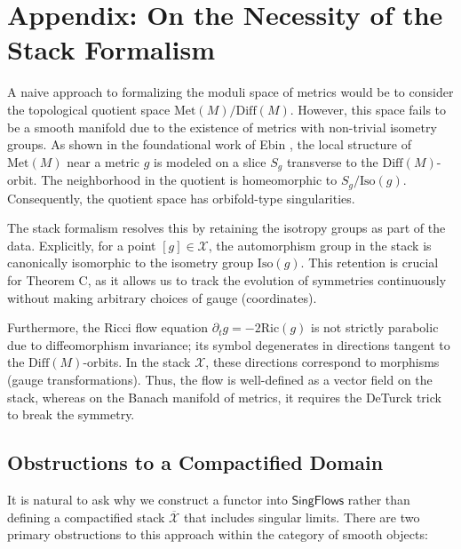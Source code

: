 \documentclass[11pt]{article}
\newcommand{\SingFlows}{\mathsf{SingFlows}}
\newcommand{\Met}{\mathrm{Met}}
\newcommand{\Diff}{\mathrm{Diff}}
\begin{document}
\appendix

\newpage
\section*{Appendix: On the Necessity of the Stack Formalism}


A naive approach to formalizing the moduli space of metrics would be to consider the topological quotient space $\Met(M) / \Diff(M)$. However, this space fails to be a smooth manifold due to the existence of metrics with non-trivial isometry groups. As shown in the foundational work of Ebin \cite{Ebi70}, the local structure of $\Met(M)$ near a metric $g$ is modeled on a slice $S_g$ transverse to the $\Diff(M)$-orbit. The neighborhood in the quotient is homeomorphic to $S_g / \mathrm{Iso}(g)$. Consequently, the quotient space has orbifold-type singularities.

The stack formalism resolves this by retaining the isotropy groups as part of the data. Explicitly, for a point $[g] \in \mathcal{X}$, the automorphism group in the stack is canonically isomorphic to the isometry group $\mathrm{Iso}(g)$. This retention is crucial for Theorem C, as it allows us to track the evolution of symmetries continuously without making arbitrary choices of gauge (coordinates).

Furthermore, the Ricci flow equation $\partial_t g = -2\mathrm{Ric}(g)$ is not strictly parabolic due to diffeomorphism invariance; its symbol degenerates in directions tangent to the $\Diff(M)$-orbits. In the stack $\mathcal{X}$, these directions correspond to morphisms (gauge transformations). Thus, the flow is well-defined as a vector field on the stack, whereas on the Banach manifold of metrics, it requires the DeTurck trick to break the symmetry.

\subsection*{Obstructions to a Compactified Domain}
It is natural to ask why we construct a functor into $\SingFlows$ rather than defining a compactified stack $\overline{\mathcal{X}}$ that includes singular limits. There are two primary obstructions to this approach within the category of smooth objects:
\end{document}
